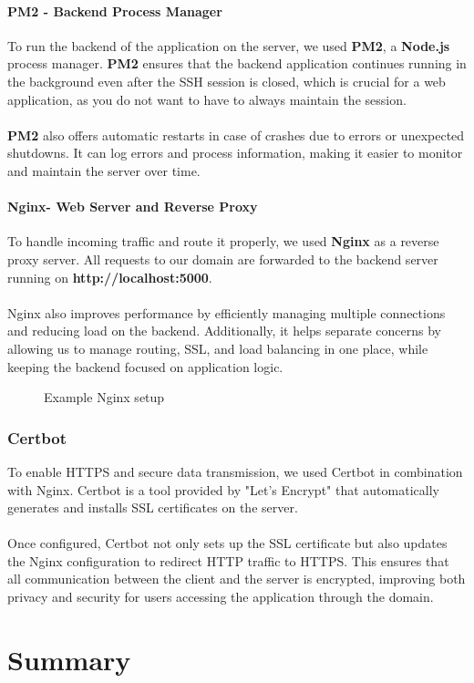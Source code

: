 \documentclass[a4paper,12pt]{report}
\begin{document}
\subsubsection{PM2 - Backend Process Manager}
To run the backend of the application on the server, we used \textbf{PM2}, a \textbf{Node.js} process manager. \textbf{PM2} ensures that the backend application continues running in the background even after the SSH session is closed, which is crucial for a web application, as you do not want to have to always maintain the session.\\\\
\textbf{PM2} also offers automatic restarts in case of crashes due to errors or unexpected shutdowns. It can log errors and process information, making it easier to monitor and maintain the server over time.
\subsubsection{Nginx- Web Server and Reverse Proxy}
To handle incoming traffic and route it properly, we used \textbf{Nginx} as a reverse proxy server. All requests to our domain are forwarded to the backend server running on \textbf{http://localhost:5000}.\\\\
Nginx also improves performance by efficiently managing multiple connections and reducing load on the backend. Additionally, it helps separate concerns by allowing us to manage routing, SSL, and load balancing in one place, while keeping the backend focused on application logic.
\begin{figure}[h!]
	\caption{Example Nginx setup}
	\label{fig:user_defined_characteristics}
\end{figure}

\subsection{Certbot}
To enable HTTPS and secure data transmission, we used Certbot in combination with Nginx. Certbot is a tool provided by "Let's Encrypt" that automatically generates and installs SSL certificates on the server.\\\\
Once configured, Certbot not only sets up the SSL certificate but also updates the Nginx configuration to redirect HTTP traffic to HTTPS. This ensures that all communication between the client and the server is encrypted, improving both privacy and security for users accessing the application through the domain.

\chapter{Summary}

\printbibliography

\listoffigures
\newpage
\end{document}
